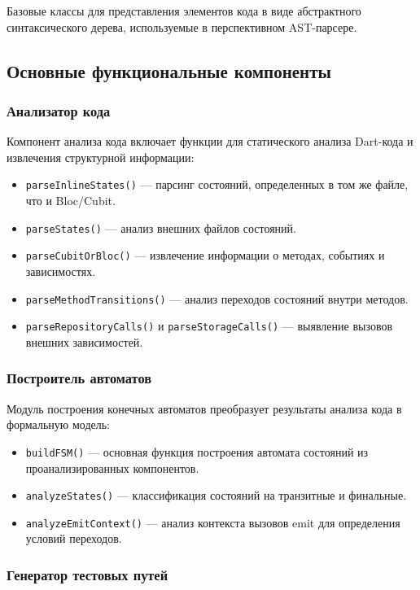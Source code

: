 \documentclass[14pt, russian]{scrartcl}
\begin{document}
Базовые классы для представления элементов кода в виде абстрактного синтаксического дерева, используемые в перспективном AST-парсере.

\subsection{Основные функциональные компоненты}

\subsubsection{Анализатор кода}

Компонент анализа кода включает функции для статического анализа Dart-кода и извлечения структурной информации:

\begin{itemize}
    \item \texttt{parseInlineStates()} — парсинг состояний, определенных в том же файле, что и Bloc/Cubit.
    \item \texttt{parseStates()} — анализ внешних файлов состояний.
    \item \texttt{parseCubitOrBloc()} — извлечение информации о методах, событиях и зависимостях.
    \item \texttt{parseMethodTransitions()} — анализ переходов состояний внутри методов.
    \item \texttt{parseRepositoryCalls()} и \texttt{parseStorageCalls()} — выявление вызовов внешних зависимостей.
\end{itemize}

\subsubsection{Построитель автоматов}

Модуль построения конечных автоматов преобразует результаты анализа кода в формальную модель:

\begin{itemize}
    \item \texttt{buildFSM()} — основная функция построения автомата состояний из проанализированных компонентов.
    \item \texttt{analyzeStates()} — классификация состояний на транзитные и финальные.
    \item \texttt{analyzeEmitContext()} — анализ контекста вызовов emit для определения условий переходов.
\end{itemize}

\subsubsection{Генератор тестовых путей}
\end{document}
